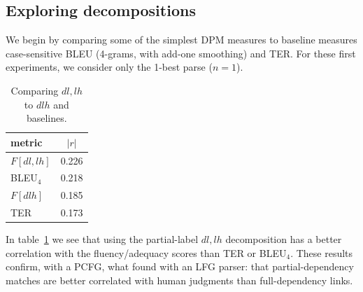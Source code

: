 \documentclass{kluwer}    %
\begin{document}
\begin{article}
\subsection{Exploring decompositions}
We begin by comparing some of the simplest DPM measures to baseline
measures case-sensitive BLEU (4-grams, with add-one smoothing) and
TER.  For these first experiments, we consider only the 1-best parse
($n=1$).
\begin{table}
  \caption{Comparing $dl,lh$ to $dlh$ and baselines.}
  \label{tab:facorr:subgraphs}
  \begin{tabular*}{2.5in}{lr}
    \hline
    metric  &    \multicolumn{1}{c}{$|r|$} \\
    \hline
    $F[dl,lh]$ &   0.226 \\
    BLEU$_4$ &   0.218 \\
    $F[dlh]$ &     0.185 \\
    TER &      0.173 \\
    \hline
  \end{tabular*}
\end{table}
In table~\ref{tab:facorr:subgraphs} we see that using the
partial-label $dl,lh$ decomposition has a better correlation with the
fluency/adequacy scores than TER or BLEU$_4$.  These results confirm,
with a PCFG, what  found with
an LFG parser: that partial-dependency matches are better correlated
with human judgments than full-dependency links.


\end{article}
\end{document}
